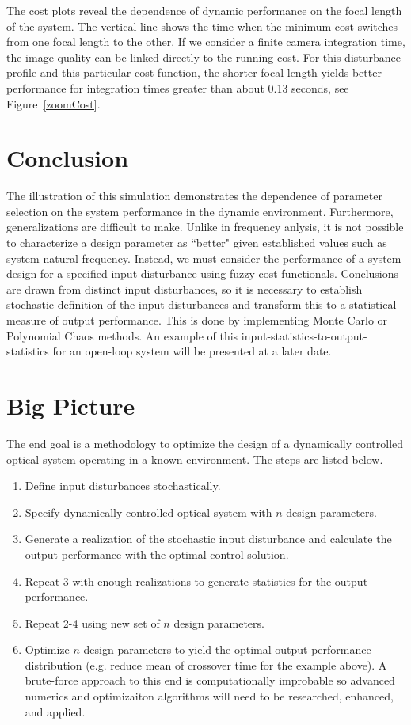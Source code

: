 \documentclass{aiaa-tc}
\begin{document}
The cost plots reveal the dependence of dynamic performance on the focal length of the system. The vertical line shows the time when the minimum cost switches from one focal length to the other. If we consider a finite camera integration time, the image quality can be linked directly to the running cost. For this disturbance profile and this particular cost function, the shorter focal length yields better performance for integration times greater than about 0.13 seconds, see Figure~\ref{zoomCost}.
\bigskip

\section{Conclusion}

The illustration of this simulation demonstrates the dependence of parameter selection on the system performance in the dynamic environment. Furthermore, generalizations are difficult to make. Unlike in frequency anlysis, it is not possible to characterize a design parameter as ``better" given established values such as system natural frequency. Instead, we must consider the performance of a system design for a specified input disturbance using fuzzy cost functionals. Conclusions are drawn from distinct input disturbances, so it is necessary to establish stochastic definition of the input disturbances and transform this to a statistical measure of output performance. This is done by implementing Monte Carlo or Polynomial Chaos methods. An example of this input-statistics-to-output-statistics for an open-loop system will be presented at a later date.

\section{Big Picture}
The end goal is a methodology to optimize the design of a dynamically controlled optical system operating in a known environment. The steps are listed below.

\begin{enumerate}
	\item Define input disturbances stochastically.
	\item Specify dynamically controlled optical system with $n$ design parameters.
	\item Generate a realization of the stochastic input disturbance and calculate the output performance with the optimal control solution.
	\item Repeat 3 with enough realizations to generate statistics for the output performance.
	\item Repeat 2-4 using new set of $n$ design parameters.
	\item Optimize $n$ design parameters to yield the optimal output performance distribution (e.g. reduce mean of crossover time for the example above). A brute-force approach to this end is computationally improbable so advanced numerics and optimizaiton algorithms will need to be researched, enhanced, and applied.
\end{enumerate}
\end{document}
